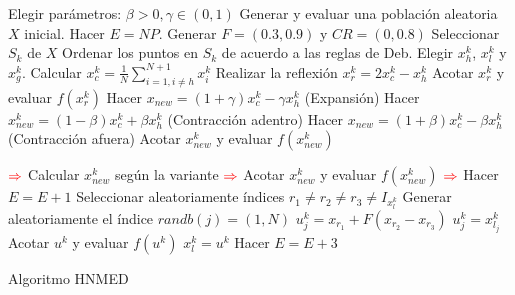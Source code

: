 \begin{algorithm}
	\begin{algorithmic}[1]
		\STATE Elegir parámetros: $\beta>0, \gamma \in (0,1)$
		\STATE Generar y evaluar una población aleatoria $X$ inicial.
        \STATE Hacer $E=NP$.
           \STATE Generar $F=(0.3,0.9)$ y $CR=(0,0.8)$
              \STATE Seleccionar $S_k$ de $X$
              \STATE Ordenar los puntos en $S_k$ de acuerdo a las reglas de Deb.
              \STATE Elegir $x^k_h$, $x^k_l$ y $x^k_g$.
              \STATE Calcular $x^k_c=\frac{1}{N} \sum_{i=1, i\neq h }^{N+1} x^k_i$
              \STATE Realizar la reflexión $x^k_r=2x^k_c -x^k_h$
              \STATE Acotar  $x^k_r$ y evaluar  $f(x^k_r)$
              \STATE Hacer $x_{new}=(1+\gamma)x^k_c-\gamma x^k_h$ (Expansión)
              \ELSE {}
              \STATE Hacer $x^k_{new}=(1-\beta)x^k_c+\beta x^k_h$ (Contracción adentro)
              \ENDIF
              \ELSE {}
              \STATE Hacer $x_{new}=(1+\beta)x^k_c-\beta x^k_h$ (Contracción afuera)
              \ENDIF
              \ENDIF
              \STATE Acotar $x^k_{new}$ y evaluar $f(x^k_{new})$
            

              \STATE $\color{red} \Rightarrow $  Calcular $x^k_{new}$ según la variante  
              \STATE $\color{red} \Rightarrow $ Acotar  $x^k_{new}$ y evaluar  $f(x^k_{new})$  
              \STATE $\color{red} \Rightarrow $ Hacer  $E=E+1$ 
              \ENDIF
              \STATE Seleccionar aleatoriamente índices $r_1 \neq r_2 \neq r_3 \neq I_{x^k_l} $
              \STATE Generar aleatoriamente el índice $randb(j)=(1,N)$ 
              	   \STATE $u^k_{j} = x_{r_1} + F (x_{r_2}-x_{r_3})$
              	\ELSE 
                  \STATE $u^k_{j} = x^k_{l_j}$
                \ENDIF
              \ENDFOR
             \STATE Acotar $u^k$ y evaluar $f(u^k)$
                  \STATE $x^k_l = u^k$
               \ENDIF
                 \STATE Hacer  $E=E+3$
        \ENDFOR
		\ENDWHILE
	\end{algorithmic}
	\caption{Algoritmo HNMED}\label{alg:HNMED}
\end{algorithm}

